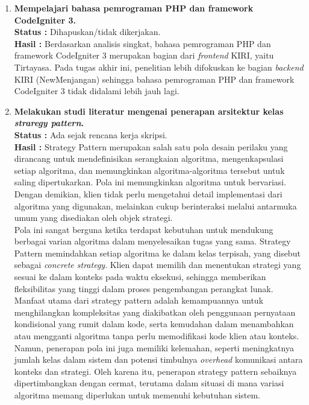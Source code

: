 \documentclass[a4paper,twoside]{article}
\begin{document}
\begin{enumerate}
		\item \textbf{Mempelajari bahasa pemrograman PHP dan framework CodeIgniter 3.}\\
		{\bf Status :} Dihapuskan/tidak dikerjakan.\\
		{\bf Hasil :} Berdasarkan analisis singkat, bahasa pemrograman PHP dan framework CodeIgniter 3 merupakan bagian dari \textit{frontend} KIRI, yaitu Tirtayasa. Pada tugas akhir ini, penelitian lebih difokuskan ke bagian \textit{backend} KIRI (NewMenjangan) sehingga bahasa pemrograman PHP dan framework CodeIgniter 3 tidak didalami lebih jauh lagi.

		\item \textbf {Melakukan studi literatur mengenai penerapan arsitektur kelas \textit{straregy pattern}.}\\
		{\bf Status :} Ada sejak rencana kerja skripsi.\\
		{\bf Hasil :} Strategy Pattern merupakan salah satu pola desain perilaku yang dirancang untuk mendefinisikan serangkaian algoritma, mengenkapsulasi setiap algoritma, dan memungkinkan algoritma-algoritma tersebut untuk saling dipertukarkan. Pola ini memungkinkan algoritma untuk bervariasi. Dengan demikian, klien tidak perlu mengetahui detail implementasi dari algoritma yang digunakan, melainkan cukup berinteraksi melalui antarmuka umum yang disediakan oleh objek strategi.
        \\
        Pola ini sangat berguna ketika terdapat kebutuhan untuk mendukung berbagai varian algoritma dalam menyelesaikan tugas yang sama. Strategy Pattern memindahkan setiap algoritma ke dalam kelas terpisah, yang disebut sebagai \textit{concrete strategy}. Klien dapat memilih dan menentukan strategi yang sesuai ke dalam konteks pada waktu eksekusi, sehingga memberikan fleksibilitas yang tinggi dalam proses pengembangan perangkat lunak.
        \newpage
        Manfaat utama dari strategy pattern adalah kemampuannya untuk menghilangkan kompleksitas yang diakibatkan oleh penggunaan pernyataan kondisional yang rumit dalam kode, serta kemudahan dalam menambahkan atau mengganti algoritma tanpa perlu memodifikasi kode klien atau konteks. Namun, penerapan pola ini juga memiliki kelemahan, seperti meningkatnya jumlah kelas dalam sistem dan potensi timbulnya \textit{overhead} komunikasi antara konteks dan strategi. Oleh karena itu, penerapan strategy pattern sebaiknya dipertimbangkan dengan cermat, terutama dalam situasi di mana variasi algoritma memang diperlukan untuk memenuhi kebutuhan sistem.
        \\

\end{enumerate}
\end{document}
